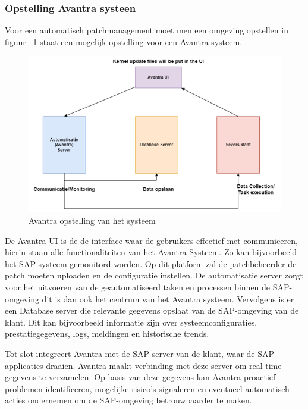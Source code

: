 \subsubsection{Opstelling Avantra systeen}
Voor een automatisch patchmanagement moet men een omgeving opstellen in figuur ~\ref{fig:avantra4} staat een mogelijk opstelling voor een Avantra systeem. 
\begin{figure}[h]
    \centering
    \includegraphics[width=\textwidth]{avantra4.png}
    \caption{Avantra opstelling van het systeem}
     \label{fig:avantra4}
\end{figure}
\newpage

De Avantra UI is de de interface waar de gebruikers effectief met communiceren, hierin staan alle functionaliteiten van het Avantra-Systeem. Zo kan bijvoorbeeld het SAP-systeem gemonitord worden. Op
dit platform zal de patchbeheerder de patch moeten uploaden en de configuratie instellen. De automatisatie server zorgt voor het uitvoeren van de geautomatiseerd taken en processen binnen de SAP-omgeving dit is dan ook het centrum van het Avantra systeem.
Vervolgens is er een Database server die relevante gegevens opslaat van de SAP-omgeving van de klant. Dit kan bijvoorbeeld informatie zijn over systeemconfiguraties, prestatiegegevens, logs, meldingen en historische trends. 

Tot slot integreert Avantra met de SAP-server van de klant, waar de SAP-applicaties draaien. Avantra maakt verbinding met deze server om real-time gegevens te verzamelen.
Op basis van deze gegevens kan Avantra proactief problemen identificeren, mogelijke risico's signaleren en eventueel automatisch acties ondernemen om de SAP-omgeving betrouwbaarder te maken.




